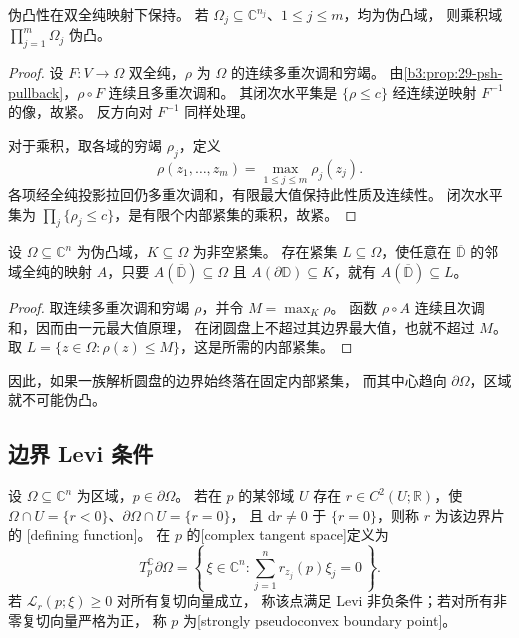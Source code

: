 \begin{proposition}[换元与乘积]\label{b3:prop:29-pseudoconvex-products}
伪凸性在双全纯映射下保持。
若 \(\Omega_j\subseteq\mathbb C^{n_j}\)、\(1\le j\le m\)，均为伪凸域，
则乘积域 \(\prod_{j=1}^m\Omega_j\) 伪凸。
\end{proposition}
\begin{proof}
设 \(F:V\to\Omega\) 双全纯，\(\rho\) 为 \(\Omega\) 的连续多重次调和穷竭。
由\cref{b3:prop:29-psh-pullback}，\(\rho\circ F\) 连续且多重次调和。
其闭次水平集是 \(\{\rho\le c\}\) 经连续逆映射 \(F^{-1}\) 的像，故紧。
反方向对 \(F^{-1}\) 同样处理。

对于乘积，取各域的穷竭 \(\rho_j\)，定义
\[
 \rho(z_1,\ldots,z_m)=\max_{1\le j\le m}\rho_j(z_j).
\]
各项经全纯投影拉回仍多重次调和，有限最大值保持此性质及连续性。
闭次水平集为 \(\prod_j\{\rho_j\le c\}\)，是有限个内部紧集的乘积，故紧。
\end{proof}

\begin{proposition}[解析圆盘的边界控制]\label{b3:prop:29-analytic-disc-control}
设 \(\Omega\subseteq\mathbb C^n\) 为伪凸域，\(K\subseteq\Omega\) 为非空紧集。
存在紧集 \(L\subseteq\Omega\)，使任意在 \(\overline{\mathbb D}\) 的邻域全纯的映射
\(A\)，只要 \(A(\overline{\mathbb D})\subseteq\Omega\) 且
\(A(\partial\mathbb D)\subseteq K\)，就有 \(A(\overline{\mathbb D})\subseteq L\)。
\end{proposition}
\begin{proof}
取连续多重次调和穷竭 \(\rho\)，并令 \(M=\max_K\rho\)。
函数 \(\rho\circ A\) 连续且次调和，因而由一元最大值原理，
在闭圆盘上不超过其边界最大值，也就不超过 \(M\)。
取 \(L=\{z\in\Omega:\rho(z)\le M\}\)，这是所需的内部紧集。
\end{proof}

因此，如果一族解析圆盘的边界始终落在固定内部紧集，
而其中心趋向 \(\partial\Omega\)，区域就不可能伪凸。


\subsection{边界 Levi 条件}
\label{b3:subsec:290403}

\begin{definition}\label{b3:def:29-boundary-levi}
设 \(\Omega\subseteq\mathbb C^n\) 为区域，\(p\in\partial\Omega\)。
若在 \(p\) 的某邻域 \(U\) 存在 \(r\in C^2(U;\mathbb R)\)，使
\(\Omega\cap U=\{r<0\}\)、\(\partial\Omega\cap U=\{r=0\}\)，
且 \(\mathrm dr\ne0\) 于 \(\{r=0\}\)，则称 \(r\) 为该边界片的
[defining function]。
在 \(p\) 的[complex tangent space]定义为
\[
 T_p^{\mathbb C}\partial\Omega
 =\left\{\,\xi\in\mathbb C^n:
       \sum_{j=1}^n r_{z_j}(p)\xi_j=0\,\right\}.
\]
若 \(\mathcal L_r(p;\xi)\ge0\) 对所有复切向量成立，
称该点满足 Levi 非负条件；若对所有非零复切向量严格为正，
称 \(p\) 为[strongly pseudoconvex boundary point]。
\end{definition}

